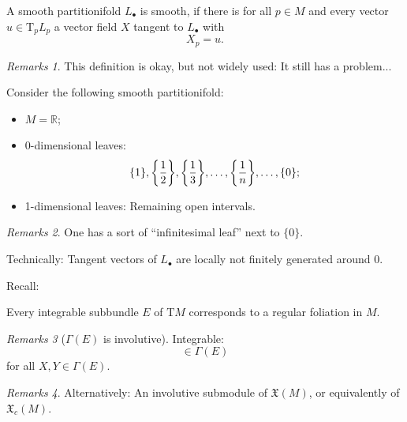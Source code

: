\documentclass[hyperref={pdfpagelabels=false}]{beamer}
\def\bes{\begin{equation*}}
\def\ees{\end{equation*}}
\theoremstyle{plain}
\theoremstyle{remark}
\newtheorem*{remark}{Remarks}
\begin{document}
\begin{frame}
\begin{definition}
A smooth partitionifold $L_\bullet$ is smooth, if there is for all $p \in M$ and every vector $u \in \mathrm{T}_p L_p$ a vector field $X$ tangent to $L_\bullet$ with
\bes
X_p = u.
\ees
\end{definition}

\pause

\begin{remark}
This definition is okay, but not widely used: It still has a problem...
\end{remark}
\end{frame}

{
\begin{frame}

\begin{example}
Consider the following smooth partitionifold:
\begin{itemize}
	\item $M = \mathbb{R}$;
	\item 0-dimensional leaves:
	\bes
	\{1\}, \mleft\{\frac{1}{2}\mright\}, \mleft\{\frac{1}{3}\mright\}, \dots, \mleft\{\frac{1}{n}\mright\}, \dots, \{0\};
	\ees
	\item 1-dimensional leaves: Remaining open intervals.
\end{itemize}
\end{example}

\pause

\begin{remark}
One has a sort of ``infinitesimal leaf'' next to $\{0\}$. 

Technically: Tangent vectors of $L_\bullet$ are locally not finitely generated around 0.
\end{remark}
\end{frame}

\begin{frame}
Recall:

\begin{theorem}
Every integrable subbundle $E$ of $\mathrm{T} M$ corresponds to a regular foliation in $M$.
\end{theorem}

\begin{remark}[$\Gamma(E)$ is involutive]
Integrable:
\bes
[X, Y] \in \Gamma(E)
\ees
for all $X, Y \in \Gamma(E)$.
\end{remark}
\pause
\begin{remark}
Alternatively: An involutive submodule of $\mathfrak{X}(M)$, or equivalently of $\mathfrak{X}_c(M)$.
\end{remark}
\end{frame}
}
\end{document}
